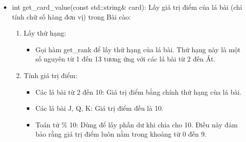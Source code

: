 \documentclass{article}
\begin{document}
\begin{itemize}
    \item int get\_card\_value(const std::string\& card): Lấy giá trị điểm của lá bài (chỉ tính chữ số hàng đơn vị) trong Bài cào:
    \begin{description}
            \begin{enumerate}
            \item Lấy thứ hạng:
                \begin{itemize}
                    \item Gọi hàm get\_rank để lấy thứ hạng của lá bài. Thứ hạng này là một số nguyên từ 1 đến 13 tương ứng với các lá bài từ 2 đến Át.
                \end{itemize}
            \item Tính giá trị điểm:
                \begin{itemize}
                    \item Các lá bài từ 2 đến 10: Giá trị điểm bằng chính thứ hạng của lá bài.
                    \item Các lá bài J, Q, K: Giá trị điểm đều là 10.
                    \item Toán tử \% 10: Dùng để lấy phần dư khi chia cho 10. Điều này đảm bảo rằng giá trị điểm luôn nằm trong khoảng từ 0 đến 9.
                \end{itemize}
        \end{enumerate}
    \end{description}
\end{itemize}
\end{document}
